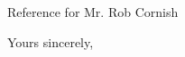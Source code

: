 \documentclass{letter}
\begin{document}
\begin{letter}{Reference for Mr. Rob Cornish}
\closing{ Yours sincerely,\\
 \\
}

\end{letter}
\end{document}
